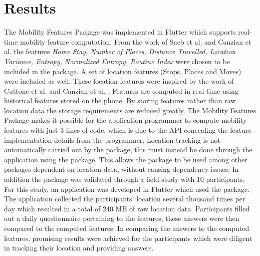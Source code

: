 \section{Results}
The Mobility Features Package was implemented in Flutter which supports real-time mobility feature computation. From the work of Saeb et al. \cite{Saeb2015} and Canzian et al. \cite{Canzian2015} the features \textit{Home Stay, Number of Places, Distance Travelled, Location Variance, Entropy, Normalized Entropy, Routine Index} were chosen to be included in the package. A set of location features (Stops, Places and Moves) were included as well. These location features were inspired by the work of Cuttone et al. \cite{sparse-location-2014} and Canzian et al. \cite{Canzian2015}. Features are computed in real-time using historical features stored on the phone. By storing features rather than raw location data the storage requirements are reduced greatly. The Mobility Features Package makes it possible for the application programmer to compute mobility features with just 3 lines of code, which is due to the API concealing the feature implementation details from the programmer. Location tracking is not automatically carried out by the package, this must instead be done through the application using the package. This allows the package to be used among other packages dependent on location data, without causing dependency issues. In addition the package was validated through a field study with 10 participants. For this study, an application was developed in Flutter which used the package. The application collected the participants' location several thousand times per day which resulted in a total of 240 MB of raw location data. Participants filled out a daily questionnaire pertaining to the features, these answers were then compared to the computed features. In comparing the answers to the computed features, promising results were achieved for the participants which were diligent in tracking their location and providing answers. 